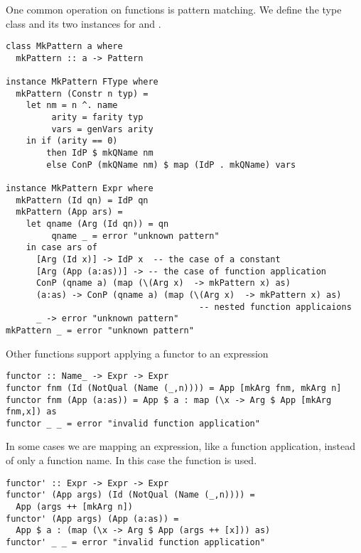One common operation on functions is pattern matching. We define the type class  and its two instances for  and . 
\begin{verbatim}
class MkPattern a where
  mkPattern :: a -> Pattern

instance MkPattern FType where 
  mkPattern (Constr n typ) =
    let nm = n ^. name 
         arity = farity typ
         vars = genVars arity 
    in if (arity == 0)
        then IdP $ mkQName nm 
        else ConP (mkQName nm) $ map (IdP . mkQName) vars 

instance MkPattern Expr where
  mkPattern (Id qn) = IdP qn
  mkPattern (App ars) =
    let qname (Arg (Id qn)) = qn
         qname _ = error "unknown pattern"
    in case ars of
      [Arg (Id x)] -> IdP x  -- the case of a constant 
      [Arg (App (a:as))] -> -- the case of function application 
      ConP (qname a) (map (\(Arg x)  -> mkPattern x) as)  
      (a:as) -> ConP (qname a) (map (\(Arg x)  -> mkPattern x) as) 
                                      -- nested function applicaions
      _ -> error "unknown pattern"
mkPattern _ = error "unknown pattern"   
\end{verbatim}

Other functions support applying a functor to an expression 
\begin{verbatim}
functor :: Name_ -> Expr -> Expr
functor fnm (Id (NotQual (Name (_,n)))) = App [mkArg fnm, mkArg n]
functor fnm (App (a:as)) = App $ a : map (\x -> Arg $ App [mkArg fnm,x]) as
functor _ _ = error "invalid function application" 
\end{verbatim}
In some cases we are mapping an expression, like a function application, instead of only a function name. In this case the function  is used. 
\begin{verbatim}
functor' :: Expr -> Expr -> Expr
functor' (App args) (Id (NotQual (Name (_,n)))) = 
  App (args ++ [mkArg n])
functor' (App args) (App (a:as)) = 
  App $ a : (map (\x -> Arg $ App (args ++ [x])) as)
functor' _ _ = error "invalid function application" 
\end{verbatim}

